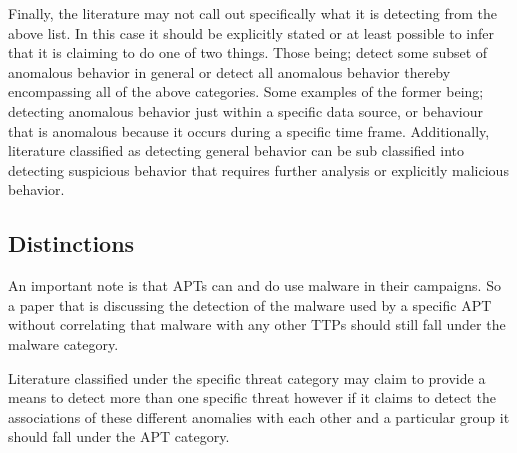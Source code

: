 Finally, the literature may not call out specifically what it is detecting from the above list.
In this case it should be explicitly stated or at least possible to infer that it is claiming to do one of two things. 
Those being; detect some subset of anomalous behavior in general or detect all anomalous behavior thereby encompassing all of the above categories.
Some examples of the former being; detecting anomalous behavior just within a specific data source, or behaviour that is anomalous because it occurs during a specific time frame. 
Additionally, literature classified as detecting general behavior can be sub classified into detecting suspicious behavior that requires further analysis or explicitly malicious behavior.

\subsection{Distinctions}
An important note is that APTs can and do use malware in their campaigns. 
So a paper that is discussing the detection of the malware used by a specific APT without correlating that malware with any other TTPs should still fall under the malware category.

Literature classified under the specific threat category may claim to provide a means to detect more than one specific threat however if it claims to detect the associations of these different anomalies with each other and a particular group it should fall under the APT category.

